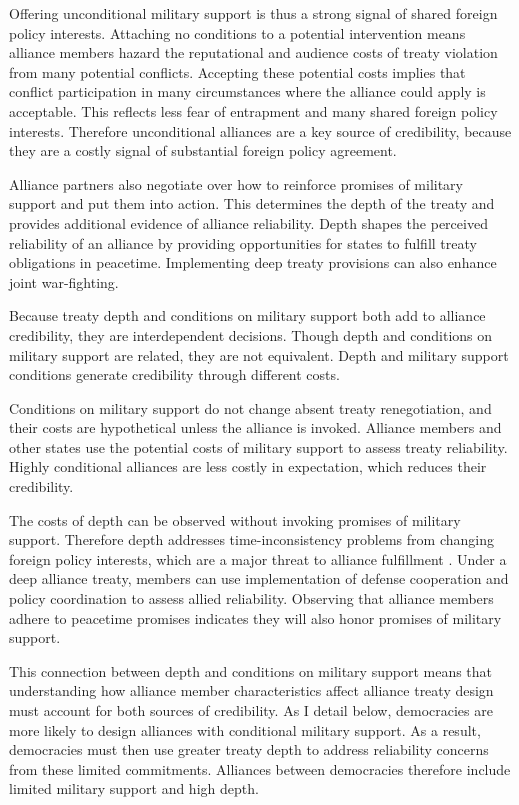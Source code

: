 \documentclass[12pt]{article}
\begin{document}
Offering unconditional military support is thus a strong signal of shared foreign policy interests. 
Attaching no conditions to a potential intervention means alliance members hazard the reputational \citep{Gibler2008, Crescenzietal2012} and audience \citep{Fearon1997} costs of treaty violation from many potential conflicts. 
Accepting these potential costs implies that conflict participation in many circumstances where the alliance could apply is acceptable.
This reflects less fear of entrapment and many shared foreign policy interests. 
Therefore unconditional alliances are a key source of credibility, because they are a costly signal of substantial foreign policy agreement. 


Alliance partners also negotiate over how to reinforce promises of military support and put them into action. 
This determines the depth of the treaty and provides additional evidence of alliance reliability. 
Depth shapes the perceived reliability of an alliance by providing opportunities for states to fulfill treaty obligations in peacetime. 
Implementing deep treaty provisions can also enhance joint war-fighting. 


Because treaty depth and conditions on military support both add to alliance credibility, they are interdependent decisions.
Though depth and conditions on military support are related, they are not equivalent. 
Depth and military support conditions generate credibility through different costs. 


Conditions on military support do not change absent treaty renegotiation, and their costs are hypothetical unless the alliance is invoked.  
Alliance members and other states use the potential costs of military support to assess treaty reliability. 
Highly conditional alliances are less costly in expectation, which reduces their credibility. 


The costs of depth can be observed without invoking promises of military support. 
Therefore depth addresses time-inconsistency problems from changing foreign policy interests, which are a major threat to alliance fulfillment \citep{LeedsSavun2007}. 
Under a deep alliance treaty, members can use implementation of defense cooperation and policy coordination to assess allied reliability. 
Observing that alliance members adhere to peacetime promises indicates they will also honor promises of military support. 


This connection between depth and conditions on military support means that understanding how alliance member characteristics affect alliance treaty design must account for both sources of credibility.  
As I detail below, democracies are more likely to design alliances with conditional military support. 
As a result, democracies must then use greater treaty depth to address reliability concerns from these limited commitments.  
Alliances between democracies therefore include limited military support and high depth. 
\end{document}
